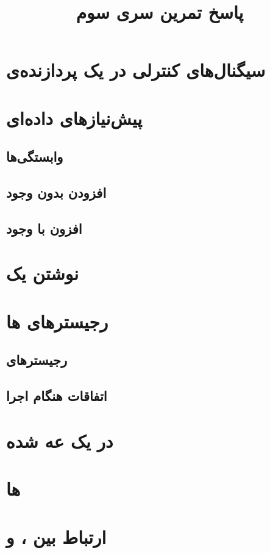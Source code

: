 \documentclass[11pt, dvipsnames, svgnames, x11names]{article}
\title{پاسخ تمرین سری سوم}
\date{}
\begin{document}
\maketitle
\tableofcontents
\newpage
\section{سیگنال‌های کنترلی در یک پردازنده‌ی }
\section{پیش‌نیاز‌‌های داده‌ای}
\subsection{وابستگی‌ها}
\subsection{افزودن  بدون وجود }
\subsection{افزون  با وجود }
\section{نوشتن یک }
\section{رجیستر‌های ها}
\subsection{رجیستر‌های }
\subsection{اتفاقات هنگام اجرا}
\section{ در یک  عه  شده}
\section{ها}
\section{ارتباط بین ،  و }
\end{document}
